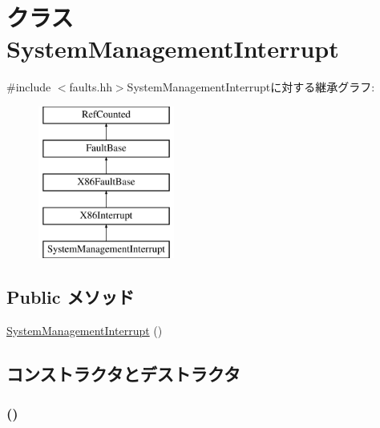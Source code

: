 \hypertarget{classX86ISA_1_1SystemManagementInterrupt}{
\section{クラス SystemManagementInterrupt}
\label{classX86ISA_1_1SystemManagementInterrupt}
}


{\ttfamily \#include $<$faults.hh$>$}SystemManagementInterruptに対する継承グラフ:\begin{figure}[H]
\begin{center}
\leavevmode
\includegraphics[height=5cm]{classX86ISA_1_1SystemManagementInterrupt}
\end{center}
\end{figure}
\subsection*{Public メソッド}
\begin{DoxyCompactItemize}
\item 
\hyperlink{classX86ISA_1_1SystemManagementInterrupt_afd864feb5ef0d7f7c23d61dac9b09c1a}{SystemManagementInterrupt} ()
\end{DoxyCompactItemize}


\subsection{コンストラクタとデストラクタ}
\hypertarget{classX86ISA_1_1SystemManagementInterrupt_afd864feb5ef0d7f7c23d61dac9b09c1a}{
\subsubsection[{SystemManagementInterrupt}]{ ()}}
\label{classX86ISA_1_1SystemManagementInterrupt_afd864feb5ef0d7f7c23d61dac9b09c1a}



